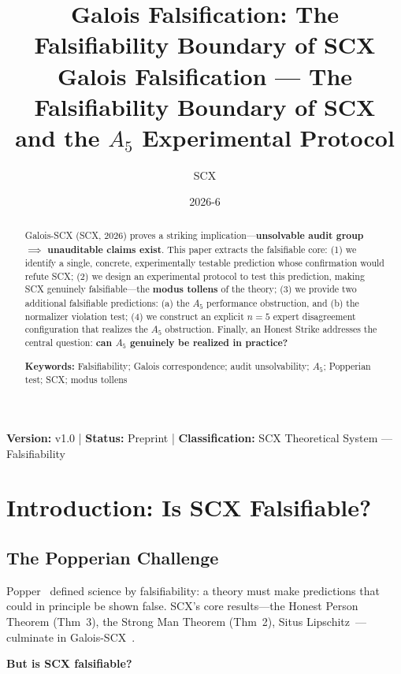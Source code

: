 \documentclass[12pt,a4paper]{article}
\title{\textbf{Galois Falsification: The Falsifiability Boundary of SCX}\\[4pt]
\large Galois Falsification --- The Falsifiability Boundary of SCX\\[2pt]
\small and the \(A_5\) Experimental Protocol}
\author{SCX}
\date{2026-6}
\theoremstyle{remark}
\begin{document}
\maketitle
\begin{center}
\footnotesize
\textbf{Version: } v1.0 \quad | \quad
\textbf{Status:} Preprint \quad | \quad
\textbf{Classification:} SCX Theoretical System --- Falsifiability
\end{center}
\begin{abstract}
Galois-SCX (SCX, 2026) proves a striking implication---\textbf{unsolvable audit group \(\implies\) unauditable claims exist}. This paper extracts the falsifiable core: (1) we identify a single, concrete, experimentally testable prediction whose confirmation would refute SCX; (2) we design an experimental protocol to test this prediction, making SCX genuinely falsifiable---the \textbf{modus tollens} of the theory; (3) we provide two additional falsifiable predictions: (a) the \(A_5\) performance obstruction, and (b) the normalizer violation test; (4) we construct an explicit \(n=5\) expert disagreement configuration that realizes the \(A_5\) obstruction. Finally, an Honest Strike addresses the central question: \textbf{can \(A_5\) genuinely be realized in practice?}

\textbf{Keywords:} Falsifiability; Galois correspondence; audit unsolvability; \(A_5\); Popperian test; SCX; modus tollens
\end{abstract}
\tableofcontents
\newpage
\section{Introduction: Is SCX Falsifiable?}
\subsection{The Popperian Challenge}
Popper~\cite{popper1934} defined science by falsifiability: a theory must make predictions that could in principle be shown false. SCX's core results---the Honest Person Theorem (Thm~3), the Strong Man Theorem (Thm~2), Situs Lipschitz~\cite{scx2026theorems,scx_lipschitz}---culminate in Galois-SCX~\cite{scx2026galois}.

\begin{center}
\textbf{But is SCX falsifiable?}
\end{center}
\end{document}
